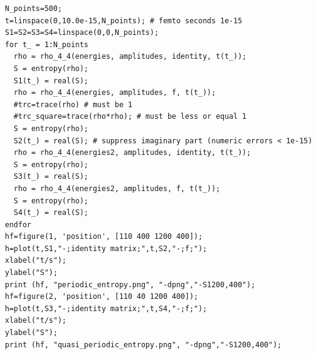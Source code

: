 \documentclass[12pt]{article}
\begin{document}
\begin{verbatim}
N_points=500;
t=linspace(0,10.0e-15,N_points); # femto seconds 1e-15
S1=S2=S3=S4=linspace(0,0,N_points);
for t_ = 1:N_points
  rho = rho_4_4(energies, amplitudes, identity, t(t_));
  S = entropy(rho);
  S1(t_) = real(S);
  rho = rho_4_4(energies, amplitudes, f, t(t_));
  #trc=trace(rho) # must be 1
  #trc_square=trace(rho*rho); # must be less or equal 1
  S = entropy(rho);
  S2(t_) = real(S); # suppress imaginary part (numeric errors < 1e-15)
  rho = rho_4_4(energies2, amplitudes, identity, t(t_));
  S = entropy(rho);
  S3(t_) = real(S);
  rho = rho_4_4(energies2, amplitudes, f, t(t_));
  S = entropy(rho);
  S4(t_) = real(S);
endfor
hf=figure(1, 'position', [110 400 1200 400]);
h=plot(t,S1,"-;identity matrix;",t,S2,"-;f;");
xlabel("t/s");
ylabel("S");
print (hf, "periodic_entropy.png", "-dpng","-S1200,400");
hf=figure(2, 'position', [110 40 1200 400]);
h=plot(t,S3,"-;identity matrix;",t,S4,"-;f;");
xlabel("t/s");
ylabel("S");
print (hf, "quasi_periodic_entropy.png", "-dpng","-S1200,400");
\end{verbatim}
\end{document}
